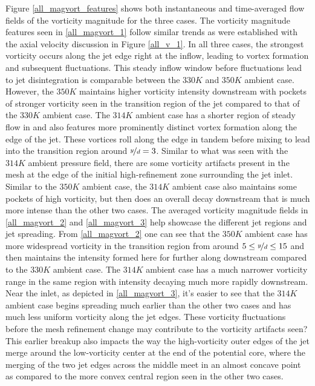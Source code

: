 Figure \ref{all_magvort_features} shows both instantaneous and time-averaged flow fields of the vorticity magnitude for the three cases. The vorticity magnitude features seen in \ref{all_magvort_1} follow similar trends as were established with the axial velocity discussion in Figure \ref{all_v_1}. In all three cases, the strongest vorticity occurs along the jet edge right at the inflow, leading to vortex formation and subsequent fluctuations. This steady inflow window before fluctuations lead to jet disintegration is comparable between the $330 K$ and $350 K$ ambient case. However, the $350 K$ maintains higher vorticity intensity downstream with pockets of stronger vorticity seen in the transition region of the jet compared to that of the $330 K$ ambient case. The $314 K$ ambient case has a shorter region of steady flow in and also features more prominently distinct vortex formation along the edge of the jet. These vortices roll along the edge in tandem before mixing to lead into the transition region around $\nicefrac{y}{d} = 3$. Similar to what was seen with the $314 K$ ambient pressure field, there are some vorticity artifacts present in the mesh at the edge of the initial high-refinement zone surrounding the jet inlet. Similar to the $350 K$ ambient case, the $314 K$ ambient case also maintains some pockets of high vorticity, but then does an overall decay downstream that is much more intense than the other two cases. The averaged vorticity magnitude fields in \ref{all_magvort_2} and \ref{all_magvort_3} help showcase the different jet regions and jet spreading. From \ref{all_magvort_2} one can see that the $350 K$ ambient case has more widespread vorticity in the transition region from around $5 \leq \nicefrac{y}{d} \leq 15$ and then maintains the intensity formed here for further along downstream compared to the $330 K$ ambient case. The $314 K$ ambient case has a much narrower vorticity range in the same region with intensity decaying much more rapidly downstream. Near the inlet, as depicted in \ref{all_magvort_3}, it's easier to see that the $314 K$ ambient case begins spreading much earlier than the other two cases and has much less uniform vorticity along the jet edges. These vorticity fluctuations before the mesh refinement change may contribute to the vorticity artifacts seen? This earlier breakup also impacts the way the high-vorticity outer edges of the jet merge around the low-vorticity center at the end of the potential core, where the merging of the two jet edges across the middle meet in an almost concave point as compared to the more convex central region seen in the other two cases. 

